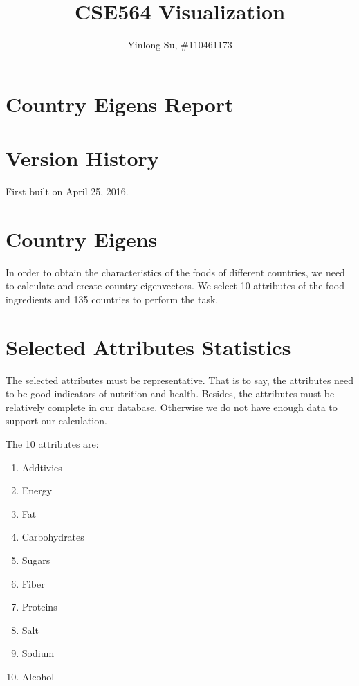 \documentclass[11pt]{article}
\begin{document}
\title{CSE564 Visualization}
\author{Yinlong Su, \#110461173}
\maketitle

\section*{Country Eigens Report}

\setcounter{section}{-1}
\section{Version History}

First built on April 25, 2016.

\section{Country Eigens}

In order to obtain the characteristics of the foods of different countries, we need to calculate and create country eigenvectors. We select 10 attributes of the food ingredients and 135 countries to perform the task.

\section{Selected Attributes Statistics}

The selected attributes must be representative. That is to say, the attributes need to be good indicators of nutrition and health. Besides, the attributes must be relatively complete in our database. Otherwise we do not have enough data to support our calculation.
\par
The 10 attributes are:
\par
\begin{enumerate}
\item Addtivies
\item Energy
\item Fat
\item Carbohydrates
\item Sugars
\item Fiber
\item Proteins
\item Salt
\item Sodium
\item Alcohol
\end{enumerate}
\end{document}
